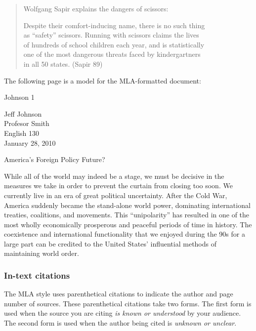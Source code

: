 \begin{itemize}
\begin{quote}
Wolfgang Sapir explains the dangers of scissors:
\begin{doublespace}

\tab \tab Despite their comfort-inducing name, there is no such thing \\ \tab \tab as ``safety'' scissors. Running with scissors claims the lives \\ \tab \tab of hundreds of school children each year, and is statistically \\ \tab \tab one of the most dangerous threats faced by kindergartners \\ \tab\tab in all 50 states. (Sapir 89)

\end{doublespace}
\end{quote}

\end{itemize}

The following page is a model for the MLA-formatted document:

\newpage
\thispagestyle{empty}
\begin{flushright}Johnson 1\end{flushright}
\bigskip
\begin{doublespace}
Jeff Johnson\\
Profesor Smith\\
English 130\\
January 28, 2010
\end{doublespace}
\begin{center}
America's Foreign Policy Future?
\end{center}
\begin{doublespace}

\tab While all of the world may indeed be a stage, we must be decisive in the measures we take in order to prevent the curtain from closing too soon. We currently live in an era of great political uncertainty. After the Cold War, America suddenly became the stand-alone world power, dominating international treaties, coalitions, and movements. This ``unipolarity'' has resulted in one of the most wholly economically prosperous and peaceful periods of time in history. The coexistence and international functionality that we enjoyed during the 90s for a large part can be credited to the United States' influential methods of maintaining world order.
\end{doublespace}
\newpage

\subsubsection{In-text citations}
The MLA style uses parenthetical citations to indicate the author and page number of sources. These parenthetical citations take two forms. The first form is used when the source you are citing \emph{is known or understood} by your audience. The second form is used when the author being cited is \emph{unknown or unclear}. 

